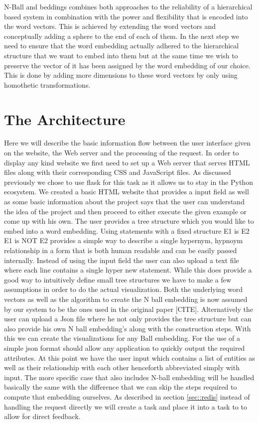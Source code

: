 \documentclass[]{article}
\begin{document}
N-Ball and beddings combines both approaches to the reliability of a hierarchical based system in combination with the power and flexibility that is encoded into the word vectors. This is achieved by extending the word vectors and conceptually adding a sphere to the end of each of them. In the next step we need to ensure that the word embedding actually adhered to the hierarchical structure that we want to embed into them but at the same time we wish to preserve the vector of it has been assigned by the word embedding of our choice. This is done by adding more dimensions to these word vectors by only using homothetic transformations.

\section{The Architecture}
\label{sec::arch}
Here we will describe the basic information flow between the user interface given on the website, the Web server and the processing of the request. In order to display any kind website we first need to set up a Web server that serves HTML files along with their corresponding CSS and JavaScript files. As discussed previously we chose to use flask for this task as it allows us to stay in the Python ecosystem. We created a basic HTML website that provides a input field as well as some basic information about the project says that the user can understand the idea of the project and then proceed to either execute the given example or come up with his own. 
The user provides a tree structure which you would like to embed into a word embedding. Using statements with a fixed structure
E1 is E2
E1 is NOT E2
provides a simple way to describe a single hypernym, hypnoym relationship in a form that is both human readable and can be easily passed internally. Instead of using the input field the user can also upload a text file where each line contains a single hyper new statement. While this does provide a good way to intuitively define small tree structures we have to make a few assumptions in order to do the actual visualization. Both the underlying word vectors as well as the algorithm to create the N ball embedding is now assumed by our system to be the ones used in the original paper [CITE]. Alternatively the user can upload a Json file where he not only provides the tree structure but can also provide his own N ball embedding's along with the construction steps. With this we can create the visualizations for any Ball embedding. For the use of a simple json format should allow any application to quickly output the required attributes. 
At this point we have the user input which contains a list of entities as well as their relationship with each other henceforth abbreviated simply with input. The more specific case that also includes N-ball embedding will be handled basically the same with the difference that we can skip the steps required to compute that embedding ourselves. As described in section \ref{sec::redis} instead of handling the request directly we will create a task and place it into a task to to allow for direct feedback.  
\end{document}
